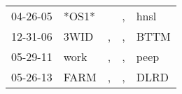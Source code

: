 \begin{supertabular}{lllll}
 04-26-05 &  *OS1* &    &  , &  hnsl \\
 12-31-06 &   3WID &  , &  , &  BTTM \\
 05-29-11 &   work &  , &  , &  peep \\
 05-26-13 &   FARM &  , &  , &  DLRD \\
\end{supertabular}
